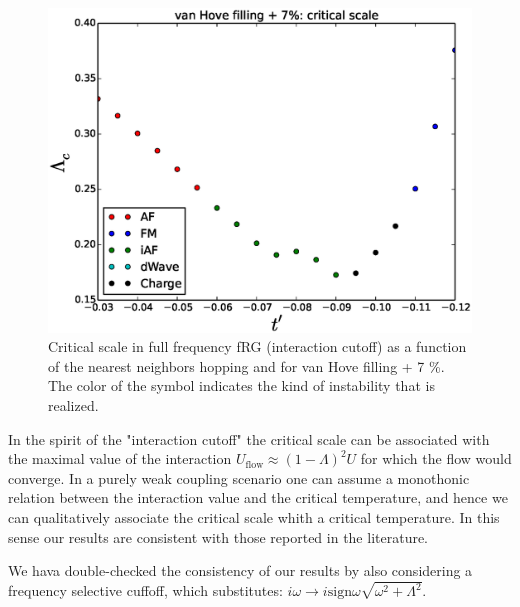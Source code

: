 \begin{figure}
\includegraphics[scale=0.5]{vanHove_plus_scan_critical_lambda_phi.eps}
\caption{Critical scale in full frequency fRG (interaction cutoff) as a function of the nearest neighbors hopping and for van Hove filling + 7 \%. The color of the symbol indicates the kind of instability that is realized.} 
\label{phasediag_van_hove_plus} 
\end{figure}



In the spirit of the "interaction cutoff" the critical scale can be associated with the maximal value of the interaction $U_{\mathrm{flow}}\approx(1-\Lambda)^2 U$  for which the flow would converge. 
In a purely weak coupling scenario one can assume a monothonic relation between the interaction value and the critical temperature, and hence we can qualitatively associate the critical scale whith a critical temperature. In this sense our results are consistent with those reported in the literature. 

We hava double-checked the consistency of our results by also considering a frequency selective cuffoff, which substitutes: $i\omega \rightarrow i\mathrm{sign} \omega \sqrt{\omega^2+\Lambda^2}$. 

